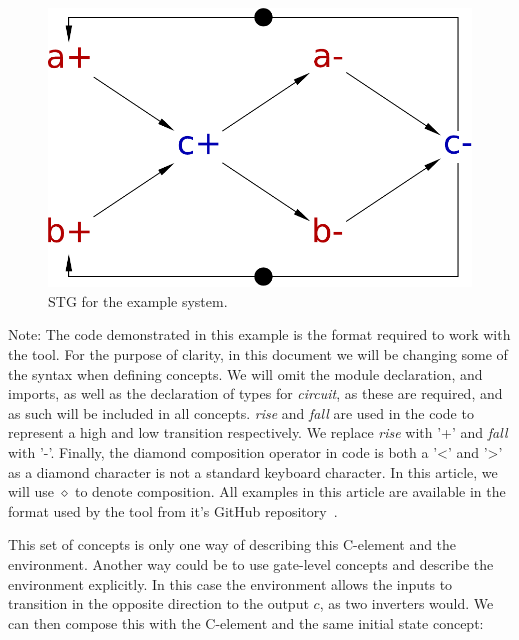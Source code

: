 \documentclass[british,compsoc]{IEEEtran}
\begin{document}
\begin{figure}[h]
\begin{centering}
\includegraphics[scale=0.25]{Images/stg-cElement}
\par\end{centering}

\protect\caption{\label{fig:cElement STG composition}STG for the example system.}
\end{figure}

Note: The code demonstrated in this example is the format required to work with the tool.
For the purpose of clarity, in this document we will be changing some of the syntax when defining concepts.
We will omit the module declaration, and imports, as well as
the declaration of types for \emph{circuit}, as these are required, and as such will be included in all concepts.
\emph{rise} and \emph{fall} are used in the code to represent a high and low transition respectively.
We replace \emph{rise} with '+' and \emph{fall} with '-'. Finally, the diamond composition operator in code is both a '<' and '>' as
a diamond character is not a standard keyboard character. In this article, we will use $\diamond$ to denote composition.
All examples in this article are available in the
format used by the tool from it's GitHub repository~\cite{2016_concepts_github}.

This set of concepts is only one way of describing this C-element
and the environment. Another way could be to use gate-level concepts
and describe the environment explicitly. In this case the environment
allows the inputs to transition in the opposite direction to the output
$c$, as two inverters would. We can then compose this with the C-element
and the same initial state concept:
\end{document}
